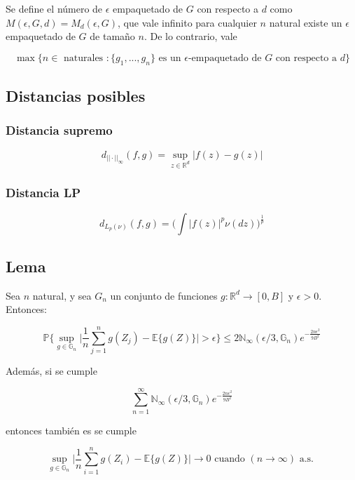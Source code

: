 \documentclass[12pt, a4paper]{article}
\begin{document}
Se define el número de $\epsilon$ empaquetado de $G$ con respecto a $d$ como $M(\epsilon,G,d)=M_d(\epsilon,G)$, que vale infinito para cualquier $n$ natural existe un $\epsilon$ empaquetado de $G$ de tamaño $n$. De lo contrario, vale

$$ \mathop{max}\big \{ n\in \text{ naturales }: \{ g_1, ..., g_n \} \text{ es un $\epsilon$-empaquetado de $G$ con respecto a $d$} \big \} $$

\subsection{Distancias posibles}
\subsubsection{Distancia supremo}
$$ d_{||\cdot||_{\infty}}(f,g)=\mathop{sup}_{z\in \mathds{R}^d}|f(z)-g(z)| $$
\subsubsection{Distancia LP}

$$ d_{L_p(\nu)}(f,g)=\bigg ( \int |f(z)|^p \nu(dz) \bigg )^{\frac{1}{p}}$$

\subsection{Lema}

Sea $n$ natural, y sea $G_n$ un conjunto de funciones $g:\mathds{R}^d \rightarrow [0,B]$ y $\epsilon > 0$. Entonces:

$$
\mathds{P}\Bigg \{ \mathop{sup}_{g\in \mathds{G}_n} \Big | \frac{1}{n} \sum_{j=1}^n g(Z_j)-\mathds{E}\{ g(Z) \} \Big | > \epsilon \Bigg \} \leq 2 \mathds{N}_{\infty} (\epsilon/3,\mathds{G}_n) e^{-\frac{2n\epsilon^2}{9B^2}}
$$

Además, si se cumple

$$
\sum_{n=1}^{\infty} \mathds{N}_{\infty} (\epsilon/3,\mathds{G}_n)e^{-\frac{2n\epsilon^2}{9B^2}}
$$

entonces también es se cumple

$$ \mathop{sup}_{g\in\mathds{G}_n} \Bigg | \frac{1}{n} \sum_{i=1}^n g(Z_i) - \mathds{E}\{g(Z)\} \Bigg | \rightarrow 0 \text{ cuando } (n\rightarrow \infty) \text{ a.s. }$$
\end{document}
